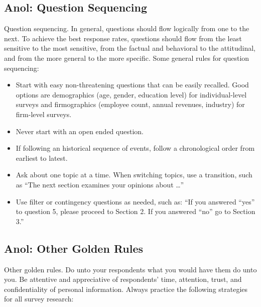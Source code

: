 \subsection{Anol: Question Sequencing}

Question sequencing. In general, questions should flow logically from one to the next. To achieve the best response rates, questions should flow from the least sensitive to the most sensitive, from the factual and behavioral to the attitudinal, and from the more general to the more specific. Some general rules for question sequencing:

\begin{itemize}
	\item Start with easy non-threatening questions that can be easily recalled. Good options are 	demographics (age, gender, education level) for individual-level surveys and firmographics (employee count, annual revenues, industry) for firm-level surveys.
	\item Never start with an open ended question.
	\item If following an historical sequence of events, follow a chronological order from earliest to latest.
	\item Ask about one topic at a time. When switching topics, use a transition, such as “The next section examines your opinions about …”
	\item Use filter or contingency questions as needed, such as: “If you answered “yes” to question 5, please proceed to Section 2. If you answered “no” go to Section 3.”
\end{itemize}

\subsection{Anol: Other Golden Rules}

Other golden rules. Do unto your respondents what you would have them do unto you. Be attentive and appreciative of respondents’ time, attention, trust, and confidentiality of personal information. Always practice the following strategies for all survey research:

